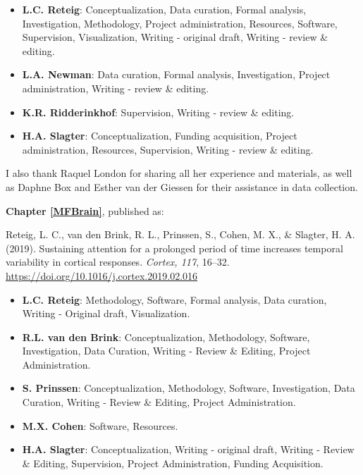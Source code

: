 \documentclass[11pt,]{memoir}
\providecommand{\tightlist}{%
  \setlength{\itemsep}{0pt}\setlength{\parskip}{0pt}}
\begin{document}
\begin{itemize}
\tightlist
\item
  \textbf{L.C. Reteig}: Conceptualization, Data curation, Formal analysis, Investigation, Methodology, Project administration, Resources, Software, Supervision, Visualization, Writing - original draft, Writing - review \& editing.
\item
  \textbf{L.A. Newman}: Data curation, Formal analysis, Investigation, Project administration, Writing - review \& editing.
\item
  \textbf{K.R. Ridderinkhof}: Supervision, Writing - review \& editing.
\item
  \textbf{H.A. Slagter}: Conceptualization, Funding acquisition, Project administration, Resources, Supervision, Writing - review \& editing.
\end{itemize}

\begin{list}{}{\leftmargin=1.5em\rightmargin=0pt}
\item
I also thank Raquel London for sharing all her experience and materials, as well as Daphne Box and Esther van der Giessen for their assistance in data collection.\newline
\end{list}

\textbf{Chapter \ref{MFBrain}}, published as:

Reteig, L. C., van den Brink, R. L., Prinssen, S., Cohen, M. X., \& Slagter, H. A. (2019). Sustaining attention for a prolonged period of time increases temporal variability in cortical responses. \emph{Cortex, 117}, 16--32. \url{https://doi.org/10.1016/j.cortex.2019.02.016}

\begin{itemize}
\tightlist
\item
  \textbf{L.C. Reteig}: Methodology, Software, Formal analysis, Data curation, Writing - Original draft, Visualization.
\item
  \textbf{R.L. van den Brink}: Conceptualization, Methodology, Software, Investigation, Data Curation, Writing - Review \& Editing, Project Administration.
\item
  \textbf{S. Prinssen}: Conceptualization, Methodology, Software, Investigation, Data Curation, Writing - Review \& Editing, Project Administration.
\item
  \textbf{M.X. Cohen}: Software, Resources.
\item
  \textbf{H.A. Slagter}: Conceptualization, Writing - original draft, Writing - Review \& Editing, Supervision, Project Administration, Funding Acquisition.
\end{itemize}
\end{document}
